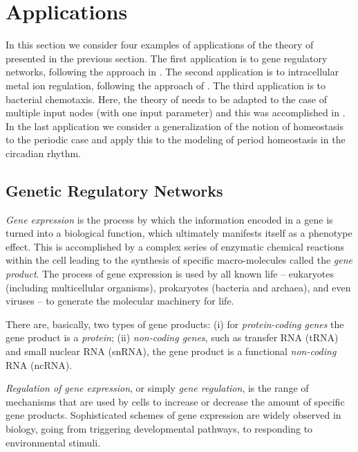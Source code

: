 \documentclass[a4paper,fleqn]{cas-dc}
\begin{document}
\section{Applications}
\label{SEC:APPL}

In this section we consider four examples of applications of the theory of \cite{wang2021,duncan2024} presented in the previous section.
The first application is to gene regulatory networks, following the approach in \cite{antoneli2018, antoneli2023}.
The second application is to intracellular metal ion regulation, following the approach of \cite{antoneli2024}.
The third application is to bacterial chemotaxis. 
Here, the theory of \cite{wang2021} needs to be adapted to the case of multiple input nodes (with one input parameter) and this was accomplished in \cite{madeira2022}.
In the last application we consider a generalization of the notion of homeostasis to the periodic case and apply this to the modeling of period homeostasis in the circadian rhythm.

\subsection{Genetic Regulatory Networks}
\label{SS:GEGRN}

{\em Gene expression} is the process by which the information encoded in a gene is turned into a biological function, which ultimately manifests itself as a phenotype effect.
This is accomplished by a complex series of enzymatic chemical reactions within the cell leading to the synthesis of specific macro-molecules called the {\em gene product}.
The process of gene expression is used by all known life -- eukaryotes (including multicellular organisms), prokaryotes (bacteria and archaea), and even viruses -- to generate the molecular machinery for life.

There are, basically, two types of gene products: (i) for {\em protein-coding genes} the gene product is a {\em protein}; (ii) {\em non-coding genes}, such as transfer RNA (tRNA) and small nuclear RNA (snRNA), the gene product is a functional {\em non-coding} RNA (ncRNA).

{\em Regulation of gene expression}, or simply {\em gene regulation}, is the range of mechanisms that are used by cells to increase or decrease the amount of specific gene products. 
Sophisticated schemes of gene expression are widely observed in biology, going from triggering developmental pathways, to responding to environmental stimuli.
\end{document}
